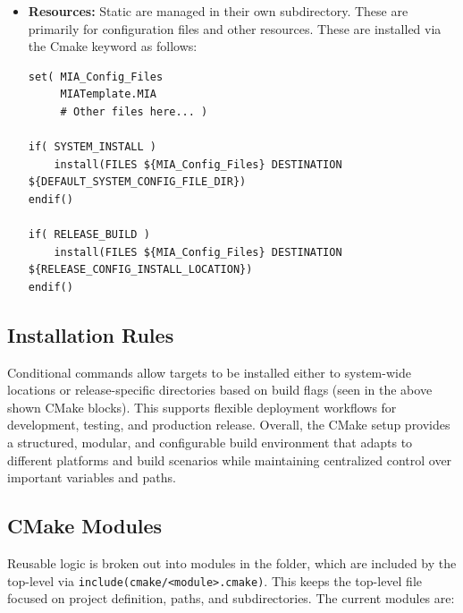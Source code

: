 \begin{itemize}
\begin{lstlisting}[style=shellstyle]
# Prefer adding tests via the cmake module helper.
add_test_dir()
	\end{lstlisting}
	\item \textbf{Resources:} Static  are managed in their own subdirectory. These are primarily for configuration files and other resources. These are installed via the  Cmake keyword as follows:
	\begin{lstlisting}[style=makestyle]
set( MIA_Config_Files
     MIATemplate.MIA
	 # Other files here... )

if( SYSTEM_INSTALL )
    install(FILES ${MIA_Config_Files} DESTINATION ${DEFAULT_SYSTEM_CONFIG_FILE_DIR})
endif()

if( RELEASE_BUILD )
    install(FILES ${MIA_Config_Files} DESTINATION ${RELEASE_CONFIG_INSTALL_LOCATION})
endif()
	\end{lstlisting}
\end{itemize}

\subsection{Installation Rules}

Conditional  commands allow targets to be installed either to system-wide locations or release-specific directories based on build flags (seen in the above shown CMake blocks). This supports flexible deployment workflows for development, testing, and production release. Overall, the CMake setup provides a structured, modular, and configurable build environment that adapts to different platforms and build scenarios while maintaining centralized control over important variables and paths.

\subsection{CMake Modules}\label{section:cmake_modules}

Reusable  logic is broken out into modules in the  folder, which are included by the top-level  via \texttt{include(cmake/<module>.cmake)}. This keeps the top-level file focused on project definition, paths, and subdirectories. The current modules are:

